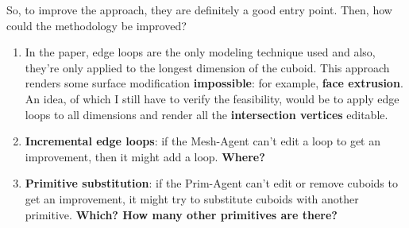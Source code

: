 \documentclass{article}
\begin{document}
So, to improve the approach, they are definitely a good entry point. Then, how could the methodology be improved?
\begin{enumerate}
	\item In the paper, edge loops are the only modeling technique used and also, they're only applied to the longest dimension of the cuboid. This approach renders some surface modification \textbf{impossible}: for example, \textbf{face extrusion}. An idea, of which I still have to verify the feasibility, would be to apply edge loops to all dimensions and render all the \textbf{intersection vertices} editable. 
	\item \textbf{Incremental edge loops}: if the Mesh-Agent can't edit a loop to get an improvement, then it might add a loop. \textbf{Where?}
	\item \textbf{Primitive substitution}: if the Prim-Agent can't edit or remove cuboids to get an improvement, it might try to substitute cuboids with another primitive. \textbf{Which? How many other primitives are there?}
\end{enumerate}
\end{document}
